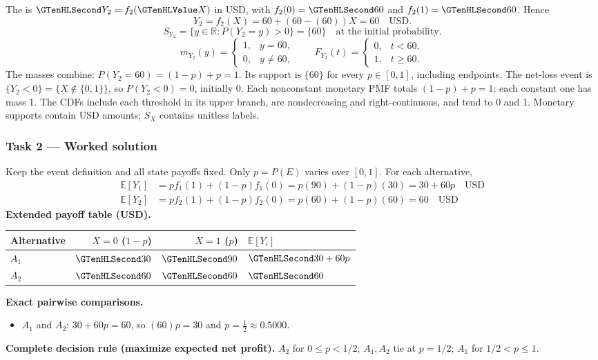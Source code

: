 The  is $\Money{Y_2}=f_2(\Indicator{X})$ in USD, with $f_2(0)=\Money{60}$ and $f_2(1)=\Money{60}$. Hence
\[Y_2=f_2(X)=60+(60-(60))X=60\quad\text{USD}.\]
\[S_{Y_2}=\{y\in\mathbb R:P(Y_2=y)>0\}=\{60\}\quad\text{at the initial probability}.\]
\[m_{Y_2}(y)=\begin{cases}1,&y=60,\\0,&y\ne 60,\end{cases}\qquad F_{Y_2}(t)=\begin{cases}0,&t<60,\\1,&t\geq 60.\end{cases}\]
The masses combine: $P(Y_2=60)=(1-p)+p=1$. Its support is $\{60\}$ for every $p\in[0,1]$, including endpoints.
The net-loss event is $\{Y_2<0\}=\{X\notin\{0,1\}\}$, so $P(Y_2<0)=0$, initially $0$.
Each nonconstant monetary PMF totals $(1-p)+p=1$; each constant one has mass 1. The CDFs include each threshold in its upper branch, are nondecreasing and right-continuous, and tend to 0 and 1. Monetary supports contain USD amounts; $S_X$ contains unitless labels.
\clearpage\subsubsection*{Task 2 --- Worked solution}\label{sol:c3-energy-decision}
Keep the event definition and all state payoffs fixed. Only $p=P(E)$ varies over $[0,1]$. For each alternative,
\begin{align*}
\mathbb E[Y_1]&=p f_1(1)+(1-p)f_1(0)=p(90)+(1-p)(30)=30+60p\quad\text{USD}\\
\mathbb E[Y_2]&=p f_2(1)+(1-p)f_2(0)=p(60)+(1-p)(60)=60\quad\text{USD}
\end{align*}
\textbf{Extended payoff table (USD).}\begin{center}\begin{tabular}{lrrl}\toprule Alternative & $X=0$ ($1-p$) & $X=1$ ($p$) & $\mathbb E[Y_i]$\\\midrule
$A_1$ & $\Money{30}$ & $\Money{90}$ & $\Money{30+60p}$\\
$A_2$ & $\Money{60}$ & $\Money{60}$ & $\Money{60}$\\
\bottomrule\end{tabular}\end{center}
\textbf{Exact pairwise comparisons.}\begin{itemize}
\item $A_1$ and $A_2$: $30+60p=60$, so $(60)p=30$ and $p=\frac{1}{2}\approx 0.5000$.
\end{itemize}
\textbf{Complete decision rule (maximize expected net profit).} $A_2$ for $0\leq p<1/2$; $A_1,A_2$ tie at $p=1/2$; $A_1$ for $1/2<p\leq1$.

